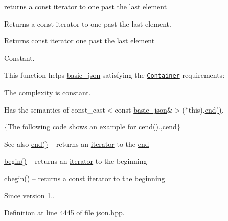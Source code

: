 returns a const iterator to one past the last element 

Returns a const iterator to one past the last element.

 \begin{DoxyReturn}{Returns}
const iterator one past the last element
\end{DoxyReturn}
Constant.

This function helps {\ttfamily \hyperlink{classnlohmann_1_1basic__json}{basic\+\_\+json}} satisfying the \href{http://en.cppreference.com/w/cpp/concept/Container}{\tt Container} requirements\+:
\begin{DoxyItemize}
\item The complexity is constant.
\item Has the semantics of {\ttfamily const\+\_\+cast$<$const \hyperlink{classnlohmann_1_1basic__json}{basic\+\_\+json}\&$>$($\ast$this).\hyperlink{classnlohmann_1_1basic__json_a12ccf14d39ddae52f6c7e126105a230b}{end()}}.
\end{DoxyItemize}

\{The following code shows an example for {\ttfamily \hyperlink{classnlohmann_1_1basic__json_a19dfb04c297ffb5f0ef84abfa4a5a087}{cend()}}.,cend\}

\begin{DoxySeeAlso}{See also}
\hyperlink{classnlohmann_1_1basic__json_a12ccf14d39ddae52f6c7e126105a230b}{end()} -- returns an \hyperlink{classnlohmann_1_1basic__json_ae3c77a8f03096da2a32a3de0c317d445}{iterator} to the \hyperlink{classnlohmann_1_1basic__json_a12ccf14d39ddae52f6c7e126105a230b}{end} 

\hyperlink{classnlohmann_1_1basic__json_ad4e381c54039607be08d7af41a1f6ad1}{begin()} -- returns an \hyperlink{classnlohmann_1_1basic__json_ae3c77a8f03096da2a32a3de0c317d445}{iterator} to the beginning 

\hyperlink{classnlohmann_1_1basic__json_aa7205e1926d3aea98adeced91b0ff5fb}{cbegin()} -- returns a const \hyperlink{classnlohmann_1_1basic__json_ae3c77a8f03096da2a32a3de0c317d445}{iterator} to the beginning
\end{DoxySeeAlso}
\begin{DoxySince}{Since}
version 1.. 
\end{DoxySince}


Definition at line 4445 of file json.\+hpp.

\hypertarget{classnlohmann_1_1basic__json_a62ccf5b9b3674aec2403fbc02da03db8}{}
